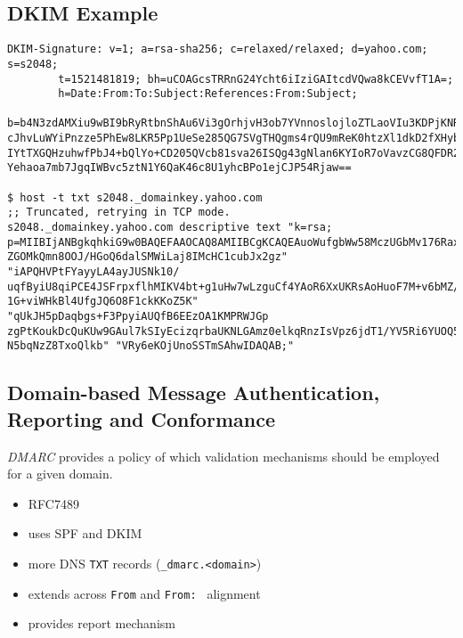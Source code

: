 \documentclass[xga]{xdvislides}
\begin{document}
\subsection{DKIM Example}
\begin{verbatim}
DKIM-Signature: v=1; a=rsa-sha256; c=relaxed/relaxed; d=yahoo.com; s=s2048;                         
        t=1521481819; bh=uCOAGcsTRRnG24Ycht6iIziGAItcdVQwa8kCEVvfT1A=;                              
        h=Date:From:To:Subject:References:From:Subject;                                             
        b=b4N3zdAMXiu9wBI9bRyRtbnShAu6Vi3gOrhjvH3ob7YVnnoslojloZTLaoVIu3KDPjKNRvccymv35Zac5toSu2C9tM
cJhvLuWYiPnzze5PhEw8LKR5Pp1UeSe285QG7SVgTHQgms4rQU9mReK0htzXl1dkD2fXHybMCFuaVEE3clqf4tRR7xMWZ2xKq4WC
IYtTXGQHzuhwfPbJ4+bQlYo+CD205QVcb81sva26ISQg43gNlan6KYIoR7oVavzCG8QFDR2lfINnFY5flNj4D3rcDa3QGyJ9pABg
Yehaoa7mb7JgqIWBvc5ztN1Y6QaK46c8U1yhcBPo1ejCJP54Rjaw==                                              

$ host -t txt s2048._domainkey.yahoo.com
;; Truncated, retrying in TCP mode.
s2048._domainkey.yahoo.com descriptive text "k=rsa;
p=MIIBIjANBgkqhkiG9w0BAQEFAAOCAQ8AMIIBCgKCAQEAuoWufgbWw58MczUGbMv176Raxd
ZGOMkQmn8OOJ/HGoQ6dalSMWiLaj8IMcHC1cubJx2gz" "iAPQHVPtFYayyLA4ayJUSNk10/
uqfByiU8qiPCE4JSFrpxflhMIKV4bt+g1uHw7wLzguCf4YAoR6XxUKRsAoHuoF7M+v6bMZ/X
1G+viWHkBl4UfgJQ6O8F1ckKKoZ5K" "qUkJH5pDaqbgs+F3PpyiAUQfB6EEzOA1KMPRWJGp
zgPtKoukDcQuKUw9GAul7kSIyEcizqrbaUKNLGAmz0elkqRnzIsVpz6jdT1/YV5Ri6YUOQ5s
N5bqNzZ8TxoQlkb" "VRy6eKOjUnoSSTmSAhwIDAQAB;"
\end{verbatim}

\subsection{Domain-based Message Authentication, Reporting and Conformance}
{\em DMARC} provides a policy of which validation
mechanisms should be employed for a given domain.

\begin{itemize}
	\item RFC7489
	\item uses SPF and DKIM
	\item more DNS {\tt TXT} records (\verb+_dmarc.<domain>+)
	\item extends across {\tt From} and {\tt From: } alignment
	\item provides report mechanism
\end{itemize}
\vspace{.25in}
\end{document}
